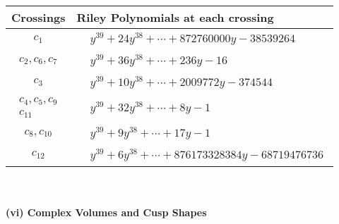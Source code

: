 \documentclass[1p]{elsarticle_modified}
\theoremstyle{definition}
\begin{document}
\begin{tabular}{m{50pt}|m{274pt}}
Crossings & \hspace{64pt}Riley Polynomials at each crossing \\
\hline $$\begin{aligned}c_{1}\end{aligned}$$&$\begin{aligned}
&y^{39}+24 y^{38}+\cdots+872760000 y-38539264
\end{aligned}$\\
\hline $$\begin{aligned}c_{2},c_{6},c_{7}\end{aligned}$$&$\begin{aligned}
&y^{39}+36 y^{38}+\cdots+236 y-16
\end{aligned}$\\
\hline $$\begin{aligned}c_{3}\end{aligned}$$&$\begin{aligned}
&y^{39}+10 y^{38}+\cdots+2009772 y-374544
\end{aligned}$\\
\hline $$\begin{aligned}c_{4},c_{5},c_{9}\\c_{11}\end{aligned}$$&$\begin{aligned}
&y^{39}+32 y^{38}+\cdots+8 y-1
\end{aligned}$\\
\hline $$\begin{aligned}c_{8},c_{10}\end{aligned}$$&$\begin{aligned}
&y^{39}+9 y^{38}+\cdots+17 y-1
\end{aligned}$\\
\hline $$\begin{aligned}c_{12}\end{aligned}$$&$\begin{aligned}
&y^{39}+6 y^{38}+\cdots+876173328384 y-68719476736
\end{aligned}$\\
\hline
\end{tabular}\\~\\
\newpage\flushleft \textbf{(vi) Complex Volumes and Cusp Shapes}
\end{document}
